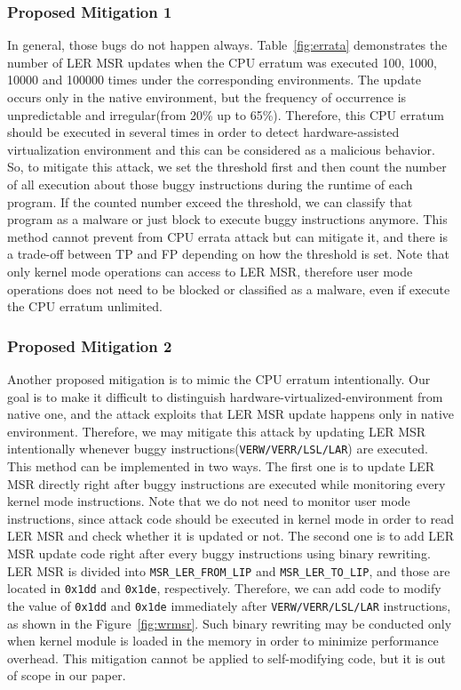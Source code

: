 \subsubsection{Proposed Mitigation 1}
In general, those bugs do not happen always. Table~\ref{fig:errata} demonstrates the number of LER MSR updates when the CPU erratum was executed 100, 1000, 10000 and 100000 times under the corresponding environments. The update occurs only in the native environment, but the frequency of occurrence is unpredictable and irregular(from 20\% up to 65\%). Therefore, this CPU erratum should be executed in several times in order to detect hardware-assisted virtualization environment and this can be considered as a malicious behavior. So, to mitigate this attack, we set the threshold first and then count the number of all execution about those buggy instructions during the runtime of each program. If the counted number exceed the threshold, we can classify that program as a malware or just block to execute buggy instructions anymore. This method cannot prevent from CPU errata attack but can mitigate it, and there is a trade-off between TP and FP depending on how the threshold is set. Note that only kernel mode operations can access to LER MSR, therefore user mode operations does not need to be blocked or classified as a malware, even if execute the CPU erratum unlimited.

\subsubsection{Proposed Mitigation 2}
Another proposed mitigation is to mimic the CPU erratum intentionally. Our goal is to make it difficult to distinguish hardware-virtualized-environment from native one, and the attack exploits that LER MSR update happens only in native environment. Therefore, we may mitigate this attack by updating LER MSR intentionally whenever buggy instructions(\texttt{VERW/VERR/LSL/LAR}) are executed. This method can be implemented in two ways. The first one is to update LER MSR directly right after buggy instructions are executed while monitoring every kernel mode instructions. Note that we do not need to monitor user mode instructions, since attack code should be executed in kernel mode in order to read LER MSR and check whether it is updated or not. The second one is to add LER MSR update code right after every buggy instructions using binary rewriting. LER MSR is divided into {\tt MSR\_LER\_FROM\_LIP} and {\tt MSR\_LER\_TO\_LIP}, and those are located in {\tt 0x1dd} and {\tt 0x1de}, respectively. Therefore, we can add code to modify the value of {\tt0x1dd} and {\tt 0x1de} immediately after \texttt{VERW/VERR/LSL/LAR} instructions, as shown in the Figure~\ref{fig:wrmsr}. Such binary rewriting may be conducted only when kernel module is loaded in the memory in order to minimize performance overhead. This mitigation cannot be applied to self-modifying code, but it is out of scope in our paper.


